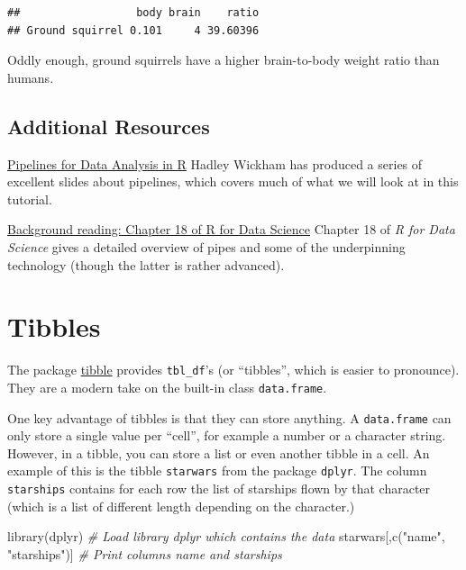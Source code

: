 \documentclass[
]{book}
\newenvironment{Shaded}{\begin{snugshade}}{\end{snugshade}}
\newcommand{\CommentTok}[1]{\textcolor[rgb]{0.56,0.35,0.01}{\textit{#1}}}
\newcommand{\FunctionTok}[1]{\textcolor[rgb]{0.00,0.00,0.00}{#1}}
\newcommand{\NormalTok}[1]{#1}
\newcommand{\StringTok}[1]{\textcolor[rgb]{0.31,0.60,0.02}{#1}}
\begin{document}
\begin{verbatim}
##                  body brain    ratio
## Ground squirrel 0.101     4 39.60396
\end{verbatim}

Oddly enough, ground squirrels have a higher brain-to-body weight ratio than humans.

\hypertarget{additional-resources}{%
\subsection{Additional Resources}\label{additional-resources}}

\href{\%22https://speakerdeck.com/hadley/pipelines-for-data-analysis-in-r\%22}{Pipelines for Data Analysis in R}
Hadley Wickham has produced a series of excellent slides about pipelines, which covers much of what we will look at in this tutorial.

\href{\%22http://r4ds.had.co.nz/pipes.html\%22}{Background reading: Chapter 18 of R for Data Science}
Chapter 18 of \emph{R for Data Science} gives a detailed overview of pipes and some of the underpinning technology (though the latter is rather advanced).

\hypertarget{tibbles}{%
\section{Tibbles}\label{tibbles}}

The package \href{https://cran.r-project.org/web/packages/tibble/}{tibble} provides \texttt{tbl\_df}'s (or ``tibbles'', which is easier to pronounce). They are a modern take on the built-in class \texttt{data.frame}.

One key advantage of tibbles is that they can store anything. A \texttt{data.frame} can only store a single value per ``cell'', for example a number or a character string. However, in a tibble, you can store a list or even another tibble in a cell. An example of this is the tibble \texttt{starwars} from the package \texttt{dplyr}. The column \texttt{starships} contains for each row the list of starships flown by that character (which is a list of different length depending on the character.)

\begin{Shaded}
\begin{Highlighting}[]
\FunctionTok{library}\NormalTok{(dplyr)                             }\CommentTok{\# Load library dplyr which contains the data}
\NormalTok{starwars[,}\FunctionTok{c}\NormalTok{(}\StringTok{"name"}\NormalTok{, }\StringTok{"starships"}\NormalTok{)]          }\CommentTok{\# Print columns name and starships}
\end{Highlighting}
\end{Shaded}
\end{document}
